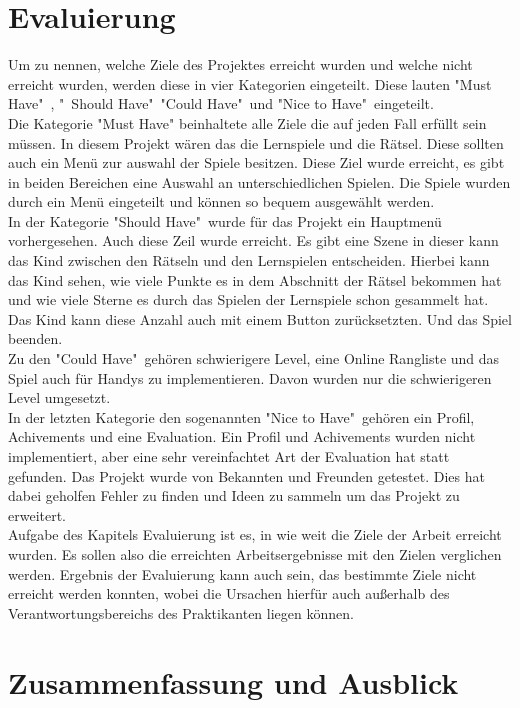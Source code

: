 \chapter{Evaluierung}
Um zu nennen, welche Ziele des Projektes erreicht wurden und welche nicht erreicht wurden, werden diese in vier Kategorien eingeteilt. Diese lauten "Must Have"\ , "\ Should Have"\, "Could Have"\ und "Nice to Have"\ eingeteilt.\\
Die Kategorie "Must Have" beinhaltete alle Ziele die auf jeden Fall erfüllt sein müssen. In diesem Projekt wären das die Lernspiele und die Rätsel. Diese sollten auch ein Menü zur auswahl der Spiele besitzen. Diese Ziel wurde erreicht, es gibt in beiden Bereichen eine Auswahl an unterschiedlichen Spielen. Die Spiele wurden durch ein Menü eingeteilt und können so bequem ausgewählt werden.\\
In der Kategorie "Should Have"\ wurde für das Projekt ein Hauptmenü vorhergesehen. Auch diese Zeil wurde erreicht. Es gibt eine Szene in dieser kann das Kind zwischen den Rätseln und den Lernspielen entscheiden. Hierbei kann das Kind sehen, wie viele Punkte es in dem Abschnitt der Rätsel bekommen hat und wie viele Sterne es durch das Spielen der Lernspiele schon gesammelt hat. Das Kind kann diese Anzahl auch mit einem Button zurücksetzten. Und das Spiel beenden.\\
Zu den "Could Have"\ gehören schwierigere Level, eine Online Rangliste und das Spiel auch für Handys zu implementieren. Davon wurden nur die schwierigeren Level umgesetzt.\\ %
In der letzten Kategorie den sogenannten "Nice to Have"\, gehören ein Profil, Achivements und eine Evaluation. Ein Profil und Achivements wurden nicht implementiert, aber eine sehr vereinfachtet Art der Evaluation hat statt gefunden. Das Projekt wurde von Bekannten und Freunden getestet. Dies hat dabei geholfen Fehler zu finden und Ideen zu sammeln um das Projekt zu erweitert.\\


Aufgabe des Kapitels Evaluierung ist es, in wie weit die Ziele der 
Arbeit erreicht wurden. Es sollen also die erreichten Arbeitsergebnisse 
mit den Zielen verglichen werden. Ergebnis der Evaluierung kann auch 
sein, das bestimmte Ziele nicht erreicht werden konnten, wobei die 
Ursachen hierfür auch außerhalb des Verantwortungsbereichs des 
Praktikanten liegen können.

\chapter{Zusammenfassung und Ausblick}
\label{cha:zusammenfassung}

